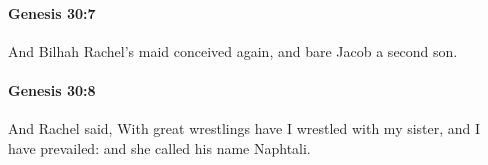 		\paragraph{Genesis 30:7} %
			\label{GENESIS-30-7}

			And Bilhah Rachel's maid conceived again, and bare Jacob a second son.


		\paragraph{Genesis 30:8} %
			\label{GENESIS-30-8}

			And Rachel said, With great wrestlings have I wrestled with my sister, and I have prevailed: and she called his name Naphtali.


